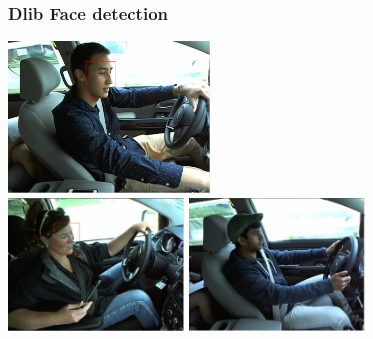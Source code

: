 \documentclass{beamer}
\begin{document}
	\begin{frame}
		\frametitle{Dlib Face detection}
		\begin{center}
			\includegraphics[width=0.4\textwidth]{faces/dlibface1} \\ \vspace{0.1cm}
			\includegraphics[width=0.35\textwidth]{faces/dlibface2} \hspace{0.1cm}
			\includegraphics[width=0.35\textwidth]{faces/dlibface3}
		\end{center}		
	\end{frame}
	
\end{document}
